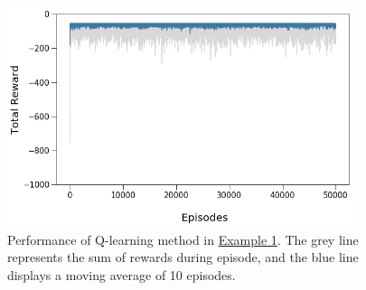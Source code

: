 \begin{figure}[hbt!]
    \centering
    \includegraphics[width=0.9\textwidth]{figures/Reinforcement/performance.png}
    \caption{Performance of Q-learning method in \hyperref[fig:toy graph]{Example 1}. The grey line represents the sum of rewards during episode, and the blue line displays a moving average of 10 episodes.}
    \label{fig:q-learning graph}
\end{figure}

